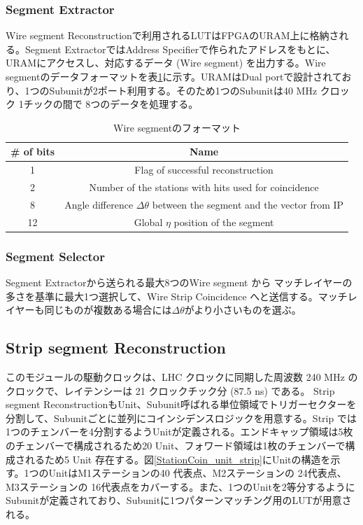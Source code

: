 \subsubsection*{Segment Extractor}
Wire segment Reconstructionで利用されるLUTはFPGAのURAM上に格納される。Segment ExtractorではAddress Specifierで作られたアドレスをもとに、URAMにアクセスし、対応するデータ (Wire segment) を出力する。Wire segmentのデータフォーマットを表\ref{tab:WireSegment}に示す。URAMはDual portで設計されており、1つのSubunitが2ポート利用する。そのため1つのSubunitは40 MHz クロック 1チックの間で 8つのデータを処理する。

\begin{table}[h]
    \centering
    \caption{Wire segmentのフォーマット}
    \label{tab:WireSegment}
    \begin{tabular}{|c|c|}
    \hline
    \# of bits & Name                                                                       \\ \hline\hline
    1          & Flag of successful reconstruction                                          \\ \hline
    2          & Number of the stations with hits used for coincidence                      \\ \hline
    8          & Angle difference $\Delta\theta$ between the segment and the vector from IP \\ \hline
    12         & Global $\eta$ position of the segment                                      \\ \hline
    \end{tabular}
\end{table}

\subsubsection*{Segment Selector}
Segment Extractorから送られる最大8つのWire segment から マッチレイヤーの多さを基準に最大1つ選択して、Wire Strip Coincidence へと送信する。マッチレイヤーも同じものが複数ある場合には$\Delta\theta$がより小さいものを選ぶ。

\subsection*{Strip segment Reconstruction}
このモジュールの駆動クロックは、LHC クロックに同期した周波数 240 MHz のクロックで、レイテンシーは 21 クロックチック分 (87.5 ns) である。
Strip segment ReconstructionもUnit、Subunit呼ばれる単位領域でトリガーセクターを分割して、Subunitごとに並列にコインシデンスロジックを用意する。Strip では 1つのチェンバーを4分割するようUnitが定義される。エンドキャップ領域は5枚のチェンバーで構成されるため20 Unit、フォワード領域は1枚のチェンバーで構成されるため5 Unit 存在する。図\ref{StationCoin_unit_strip}にUnitの構造を示す。1つのUnitはM1ステーションの40 代表点、M2ステーションの 24代表点、M3ステーションの 16代表点をカバーする。また、1つのUnitを2等分するようにSubunitが定義されており、Subunitに1つパターンマッチング用のLUTが用意される。

